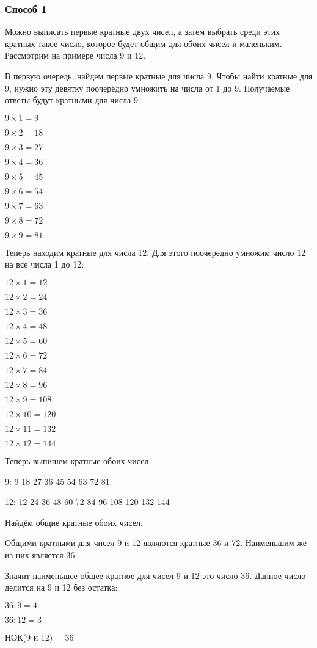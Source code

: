\documentclass[12pt]{article}
\begin{document}
    \subsubsection{Способ 1}
    Можно выписать первые кратные двух чисел, а затем выбрать среди этих кратных такое число, которое будет общим для обоих чисел и маленьким. Рассмотрим на примере числа 9 и 12.\par
    В первую очередь, найдем первые кратные для числа 9. Чтобы найти кратные для 9, нужно эту девятку поочерёдно умножить на числа от 1 до 9. Получаемые ответы будут кратными для числа 9.\par
    $9 \times 1 = 9$\par
    $9 \times 2 = 18$\par
    $9 \times 3 = 27$\par
    $9 \times 4 = 36$\par
    $9 \times 5 = 45$\par
    $9 \times 6 = 54$\par
    $9 \times 7 = 63$\par
    $9 \times 8 = 72$\par
    $9 \times 9 = 81$\par
    Теперь находим кратные для числа 12. Для этого поочерёдно умножим число 12 на все числа 1 до 12:\par
    $12 \times 1 = 12$\par
    $12 \times 2 = 24$\par
    $12 \times 3 = 36$\par
    $12 \times 4 = 48$\par
    $12 \times 5 = 60$\par
    $12 \times 6 = 72$\par
    $12 \times 7 = 84$\par
    $12 \times 8 = 96$\par
    $12 \times 9 = 108$\par
    $12 \times 10 = 120$\par
    $12 \times 11 = 132$\par
    $12 \times 12 = 144$\par
    Теперь выпишем кратные обоих чисел:\par
    9: 9 18 27 36 45 54 63 72 81\par
    12: 12 24 36 48 60 72 84 96 108 120 132 144\par
    Найдём общие кратные обоих чисел.\par
    Общими кратными для чисел 9 и 12 являются кратные 36 и 72. Наименьшим же из них является 36.\par
    Значит наименьшее общее кратное для чисел 9 и 12 это число 36. Данное число делится на 9 и 12 без остатка:\par
    $36 : 9 = 4$\par
    $36 : 12 = 3$\par
    НОК(9 и 12) = 36\par
\end{document}
